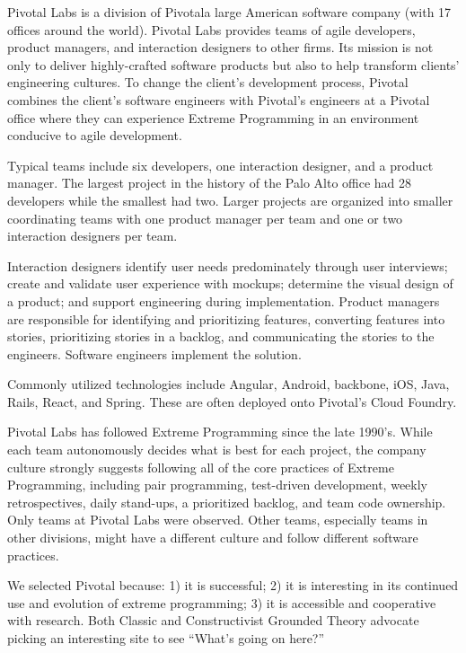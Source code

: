 Pivotal Labs is a division of Pivotal\textemdash a large American software company (with 17 offices around the world). Pivotal Labs provides teams of agile developers, product managers, and interaction designers to other firms. Its mission is not only to deliver highly-crafted software products but also to help transform clients' engineering cultures. To change the client's development process, Pivotal combines the client's software engineers with Pivotal's engineers at a Pivotal office where they can experience Extreme Programming \cite{BeckExtremeProgramming2004} in an environment conducive to agile development. 


Typical teams include six developers, one interaction designer, and a product manager. The largest project in the history of the Palo Alto office had 28 developers while the smallest had two. Larger projects are organized into smaller coordinating teams with one product manager per team and one or two interaction designers per team.


Interaction designers identify user needs predominately through user interviews; create and validate user experience with mockups; determine the visual design of a product; and support engineering during implementation. Product managers are responsible for identifying and prioritizing features, converting features into stories, prioritizing stories in a backlog, and communicating the stories to the engineers. Software engineers implement the solution. 


Commonly utilized technologies include Angular, Android, backbone, iOS, Java, Rails, React, and Spring. These are often deployed onto Pivotal's Cloud Foundry. 


Pivotal Labs has followed Extreme Programming \cite{BeckExtremeProgramming2004} since the late 1990's. While each team autonomously decides what is best for each project, the company culture strongly suggests following all of the core practices of Extreme Programming, including pair programming, test-driven development, weekly retrospectives, daily stand-ups, a prioritized backlog, and team code ownership. Only  teams at Pivotal Labs were observed. Other teams, especially teams in other divisions, might have a different culture and follow different software practices.

We selected Pivotal because: 1) it is successful; 2) it is interesting in its continued use and evolution of extreme programming; 3) it is accessible and cooperative with research. Both Classic and Constructivist Grounded Theory advocate picking an interesting site to see “What’s going on here?” 

